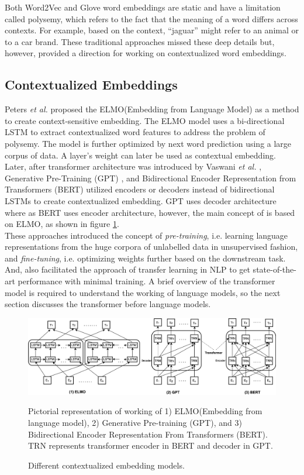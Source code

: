 \documentclass[%
	BCOR=8mm, %
	DIV=12,
	toc=bibliography, %
	toc=listof, %
	oneside, %
	egregdoesnotlikesansseriftitles, %
	]{scrbook}
\begin{document}
 Both Word2Vec and Glove word embeddings are static and have a limitation called polysemy, which refers to the fact that the meaning of a word differs across contexts. For example, based on the context, ``jaguar'' might refer to an animal or to a car brand. These traditional approaches missed these deep details but, however, provided a direction for working on contextualized word embeddings.

 \subsection{Contextualized Embeddings}
 \label{subsection:contextembeddings}
 Peters \textit{et al.} \cite{peters_deep_2018-3} proposed the ELMO(Embedding from Language Model) as a method to create context-sensitive embedding. The ELMO model uses a bi-directional LSTM to extract contextualized word features to address the problem of polysemy. The model is further optimized by next word prediction using a large corpus of data. A layer's weight can later be used as contextual embedding. \\
 Later, after transformer architecture was introduced by  Vaswani \textit{et al.} \cite{vaswani_attention_2017}, Generative Pre-Training (GPT) \cite{radford_improving_2018-1}, and Bidirectional Encoder Representation from Transformers (BERT) \cite{devlin_bert_2019-1} utilized  encoders or decoders instead of bidirectional LSTMs to create contextualized embedding. GPT uses decoder architecture where as BERT uses encoder architecture, however, the main concept of is based on ELMO, as shown in figure \ref{fig:elmo}. \\
These approaches introduced the concept of \textit{pre-training}, i.e. learning language representations from the huge corpora of unlabelled data in unsupervised fashion, and \textit{fine-tuning}, i.e. optimizing weights further based on the downstream task. And, also facilitated the approach of transfer learning in NLP to get state-of-the-art performance with minimal training. A brief overview of the transformer model is required to understand the working of language models, so the next section discusses the transformer before language models.
\begin{figure}[h!]
    \centering
    \includegraphics[width=1.0\linewidth]{img/elmo}
    \caption{Different contextualized embedding models.}{Pictorial representation of working of 1) ELMO(Embedding from language model),  2) Generative Pre-training (GPT), and 3) Bidirectional Encoder Representation From Transformers (BERT). TRN represents transformer encoder in BERT and decoder in GPT.}
    \label{fig:elmo}
\end{figure}
\end{document}
